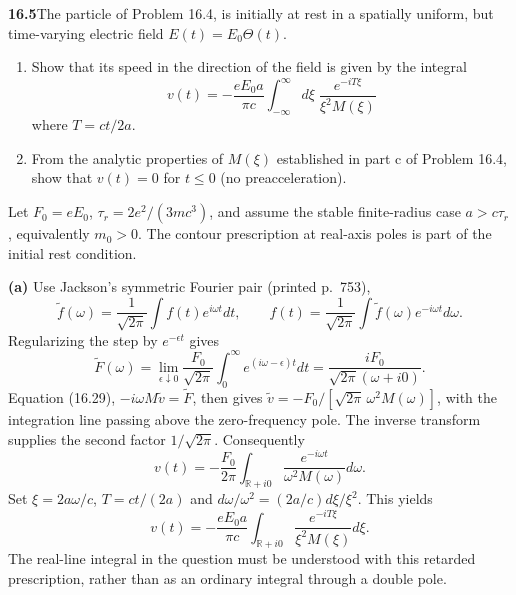 \par\bigskip
\noindent\textbf{16.5}\quad The particle of Problem 16.4,  is initially at rest in a spatially uniform, but time-varying electric field $E(t)=E_{0}\Theta(t)$.
\begin{enumerate}
\item[(a)] Show that its speed in the direction of the field is given by the integral
\[
v(t)=-\frac{eE_{0}a}{\pi c}\int_{-\infty}^{\infty}d\xi\;\frac{e^{-iT\xi}}{\xi^{2}M(\xi)}
\]
where $T=ct/2a$.
\item[(b)] From the analytic properties of $M(\xi)$ established in part c of Problem 16.4, show that $v(t)=0$ for $t\leq0$ (no preacceleration).
\end{enumerate}
\solution

Let $F_0=eE_0$, $\tau_r=2e^2/(3mc^3)$, and assume the stable
finite-radius case $a>c\tau_r$, equivalently $m_0>0$.
The contour prescription at real-axis poles is part of the initial
rest condition.

\textbf{(a)} Use Jackson's symmetric Fourier pair (printed p.~753),
\[
\widetilde f(\omega)=\frac1{\sqrt{2\pi}}\int f(t)e^{i\omega t}dt,
\qquad
f(t)=\frac1{\sqrt{2\pi}}\int\widetilde f(\omega)e^{-i\omega t}d\omega.
\]
Regularizing the step by $e^{-\epsilon t}$ gives
\[
\widetilde F(\omega)=\lim_{\epsilon\downarrow0}
\frac{F_0}{\sqrt{2\pi}}\int_0^\infty e^{(i\omega-\epsilon)t}dt
=\frac{iF_0}{\sqrt{2\pi}(\omega+i0)}.
\]
Equation (16.29), $-i\omega M\widetilde v=\widetilde F$, then gives
$\widetilde v=-F_0/[\sqrt{2\pi}\,\omega^2M(\omega)]$, with the
integration line passing above the zero-frequency pole. The inverse
transform supplies the second factor $1/\sqrt{2\pi}$. Consequently
\[
v(t)=-\frac{F_0}{2\pi}\int_{\mathbb R+i0}
\frac{e^{-i\omega t}}{\omega^2M(\omega)}d\omega.
\]
Set $\xi=2a\omega/c$, $T=ct/(2a)$ and
$d\omega/\omega^2=(2a/c)d\xi/\xi^2$. This yields
\[
\boxed{v(t)=-\frac{eE_0a}{\pi c}
\int_{\mathbb R+i0}\frac{e^{-iT\xi}}{\xi^2M(\xi)}d\xi.}
\]
The real-line integral in the question must be understood with this
retarded prescription, rather than as an ordinary integral through
a double pole.

